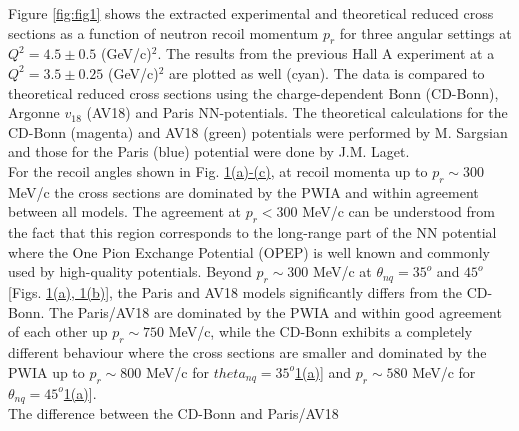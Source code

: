 \indent Figure \ref{fig:fig1} shows the extracted experimental and theoretical reduced cross sections as a function of neutron recoil momentum $p_{r}$ for three angular settings at $Q^{2}=4.5\pm0.5$
(GeV/c)$^{2}$. The results from the previous Hall A experiment\cite{PhysRevLett.107.262501} at a $Q^{2}=3.5\pm0.25$ (GeV/c)$^{2}$ are plotted as well (cyan). The data is compared to theoretical reduced
cross sections using the charge-dependent Bonn (CD-Bonn)\cite{PhysRevC.63.024001}, Argonne $v_{18}$ (AV18)\cite{PhysRevC.51.38} and Paris\cite{PhysRevC.21.861} NN-potentials. The theoretical calculations
for the CD-Bonn (magenta) and AV18 (green) potentials were performed by M. Sargsian\cite{PhysRevC.82.014612} and those for the Paris (blue) potential were done by J.M. Laget\cite{LAGET2005}. \\

\indent For the recoil angles shown in Fig. \hyperref[fig:fig1]{1(a)-(c)}, at recoil momenta up to $p_{r}\sim$300 MeV/c the cross sections are dominated by the PWIA and within agreement between all models.
The agreement at $p_{r}<300$ MeV/c can be understood from the fact that this region corresponds to the long-range part of the NN potential where the One Pion Exchange Potential (OPEP) is well known and commonly
used by high-quality potentials. Beyond $p_{r}\sim$300 MeV/c at $\theta_{nq}=35^{o}$ and $45^{o}$ [Figs. \hyperref[fig:fig1]{1(a), 1(b)}], the Paris and
AV18 models significantly differs from the CD-Bonn. The Paris/AV18 are dominated by the PWIA and within good agreement of each other up $p_{r}\sim750$ MeV/c, while the CD-Bonn exhibits a completely different
behaviour where the cross sections are smaller and dominated by the PWIA up to $p_{r}\sim800$ MeV/c for $theta_{nq}=35^{o}$\hyperref[fig:fig1]{1(a)}] and $p_{r}\sim580$ MeV/c for $\theta_{nq}=45^{o}$\hyperref[fig:fig1]{1(a)}].\\
The difference between the CD-Bonn and Paris/AV18 



